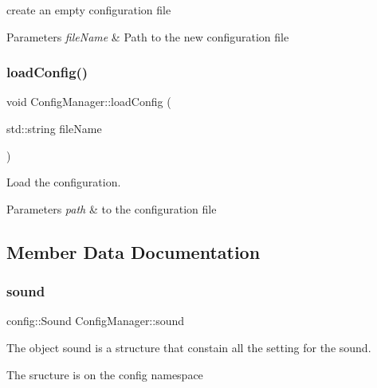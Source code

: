 create an empty configuration file 


\begin{DoxyParams}{Parameters}
{\em file\+Name} & Path to the new configuration file \\
\hline
\end{DoxyParams}
\mbox{\label{classConfigManager_a63ff6c831f037cf5bfe580b4944b0b6c}} 
\subsubsection{\texorpdfstring{load\+Config()}{loadConfig()}}
{\footnotesize\ttfamily void Config\+Manager\+::load\+Config (\begin{DoxyParamCaption}\item[{std\+::string}]{file\+Name }\end{DoxyParamCaption})}



Load the configuration. 


\begin{DoxyParams}{Parameters}
{\em path} & to the configuration file \\
\hline
\end{DoxyParams}


\subsection{Member Data Documentation}
\mbox{\label{classConfigManager_a010e2da02ebc90d7ce930d1c57a79e96}} 
\subsubsection{\texorpdfstring{sound}{sound}}
{\footnotesize\ttfamily config\+::\+Sound Config\+Manager\+::sound}



The object sound is a structure that constain all the setting for the sound. 

The sructure is on the config namespace \mbox{\label{classConfigManager_a1e0dbb8563b71871e6c68abce5620cd0}} 

